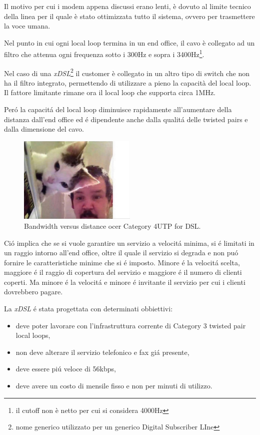 \documentclass[../ComputerNetworks.tex]{subfiles}
\begin{document}
Il motivo per cui i modem appena discussi erano lenti, è dovuto al limite tecnico della linea per il quale è stato ottimizzata tutto il sistema, ovvero per trasmettere la voce umana.

Nel punto in cui ogni local loop termina in un end office, il cavo è collegato ad un filtro che attenua ogni frequenza sotto i 300Hz e sopra i 3400Hz\footnote{il cutoff non è netto per cui si considera 4000Hz}.

Nel caso di una \emph{xDSL}\footnote{nome generico utilizzato per un generico Digital Subscriber LIne} il customer è collegato in un altro tipo di switch che non ha il filtro integrato, permettendo di utilizzare a pieno la capacità del local loop.
Il fattore limitante rimane ora il local loop che supporta circa 1MHz.

Peró la capacitá del local loop diminuisce rapidamente all’aumentare della distanza dall’end office ed é dipendente anche dalla qualitá delle twisted pairs e dalla dimensione del cavo.

\begin{figure}[h]
    \centering
    \includegraphics[width=0.5\textwidth]{img/distance.jpg}
    \caption{Bandwidth versus distance ocer Category 4UTP for DSL.}
\end{figure}

Ció implica che se si vuole garantire un servizio a velocitá minima, si é limitati in un raggio intorno all’end office, oltre il quale il servizio si degrada e non puó fornire le caratteristiche minime che si é imposto.
Minore é la velocitá scelta, maggiore é il raggio di copertura del servizio e maggiore é il numero di clienti coperti.
Ma minore é la velocitá e minore é invitante il servizio per cui i clienti dovrebbero pagare.

La \emph{xDSL} é stata progettata con determinati obbiettivi:
\begin{itemize}
    \item deve poter lavorare con l’infrastruttura corrente di Category 3 twisted pair local loops,
    \item non deve alterare il servizio telefonico e fax giá presente,
    \item deve essere piú veloce di 56kbps,
    \item deve avere un costo di mensile fisso e non per minuti di utilizzo.
\end{itemize}
\end{document}
